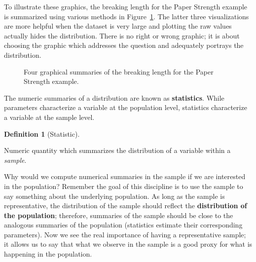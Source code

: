 \documentclass[
  letterpaper,
  DIV=11,
  numbers=noendperiod]{scrreprt}
\theoremstyle{definition}
\newtheorem{definition}{Definition}[chapter]
\theoremstyle{definition}
\theoremstyle{plain}
\theoremstyle{remark}
\begin{document}
To illustrate these graphics, the breaking length for the Paper Strength
example is summarized using various methods in
Figure~\ref{fig-summaries-univariate}. The latter three visualizations
are more helpful when the dataset is very large and plotting the raw
values actually hides the distribution. There is no right or wrong
graphic; it is about choosing the graphic which addresses the question
and adequately portrays the distribution.

\begin{figure}


\caption{\label{fig-summaries-univariate}Four graphical summaries of the
breaking length for the Paper Strength example.}

\end{figure}%

The numeric summaries of a distribution are known as
\textbf{statistics}. While parameters characterize a variable at the
population level, statistics characterize a variable at the sample
level.

\begin{definition}[Statistic]\protect\hypertarget{def-statistic}{}\label{def-statistic}

Numeric quantity which summarizes the distribution of a variable within
a \emph{sample}.

\end{definition}

Why would we compute numerical summaries in the sample if we are
interested in the population? Remember the goal of this discipline is to
use the sample to say something about the underlying population. As long
as the sample is representative, the distribution of the sample should
reflect the \textbf{distribution of the population}; therefore,
summaries of the sample should be close to the analogous summaries of
the population (statistics estimate their corresponding parameters). Now
we see the real importance of having a representative sample; it allows
us to say that what we observe in the sample is a good proxy for what is
happening in the population.
\end{document}
